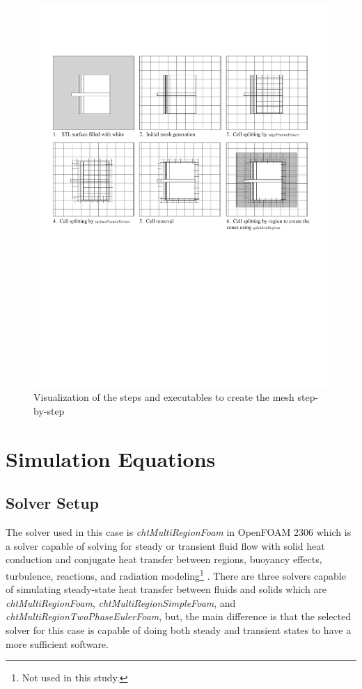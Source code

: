 \begin{figure}[htb]
     \centering
    \includegraphics[trim=1cm 11cm 1cm 3cm, clip, width=0.9\linewidth]{Figures/snappyhex.pdf}
     \caption[Mesh Creation Steps]{Visualization of the steps and executables to create the mesh step-by-step}
   \label{meshsteps}
 \end{figure}


\section{Simulation Equations}

\subsection{Solver Setup}
The solver used in this case is \textit{chtMultiRegionFoam} in OpenFOAM 2306 which is a solver capable of solving for steady or transient fluid flow with solid heat conduction and conjugate heat transfer between regions, buoyancy effects, turbulence, reactions, and radiation modeling\footnote{Not used in this study.} \cite{cht}.
There are three solvers capable of simulating steady-state heat transfer between fluids and solids which are \textit{chtMultiRegionFoam}, \textit{chtMultiRegionSimpleFoam}, and \textit{chtMultiRegionTwoPhaseEulerFoam}, but, the main difference is that the selected solver for this case is capable of doing both steady and transient states to have a more sufficient software. 


